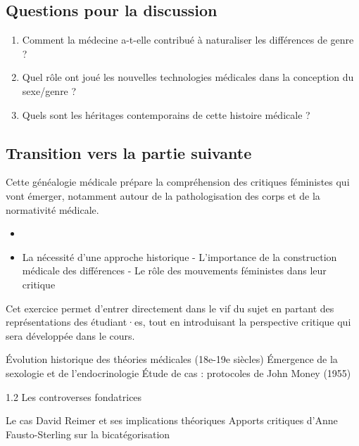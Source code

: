 \documentclass[
  letterpaper,
  DIV=11,
  numbers=noendperiod]{scrreprt}
\providecommand{\tightlist}{%
  \setlength{\itemsep}{0pt}\setlength{\parskip}{0pt}}\usepackage{longtable,booktabs,array}
\begin{document}
\subsection{Questions pour la
discussion}\label{questions-pour-la-discussion}

\begin{enumerate}
\def\labelenumi{\arabic{enumi}.}
\tightlist
\item
  Comment la médecine a-t-elle contribué à naturaliser les différences
  de genre ?
\item
  Quel rôle ont joué les nouvelles technologies médicales dans la
  conception du sexe/genre ?
\item
  Quels sont les héritages contemporains de cette histoire médicale ?
\end{enumerate}

\subsection{Transition vers la partie
suivante}\label{transition-vers-la-partie-suivante}

Cette généalogie médicale prépare la compréhension des critiques
féministes qui vont émerger, notamment autour de la pathologisation des
corps et de la normativité médicale.

\begin{description}
\tightlist
\item[Utiliser les contradictions et questionnements émergents pour
introduire]
\begin{itemize}
\tightlist
\item[]
\item
  La nécessité d'une approche historique - L'importance de la
  construction médicale des différences - Le rôle des mouvements
  féministes dans leur critique
\end{itemize}
\end{description}

Cet exercice permet d'entrer directement dans le vif du sujet en partant
des représentations des étudiant·es, tout en introduisant la perspective
critique qui sera développée dans le cours.

Évolution historique des théories médicales (18e-19e siècles) Émergence
de la sexologie et de l'endocrinologie Étude de cas : protocoles de John
Money (1955)

1.2 Les controverses fondatrices

Le cas David Reimer et ses implications théoriques Apports critiques
d'Anne Fausto-Sterling sur la bicatégorisation
\end{document}
